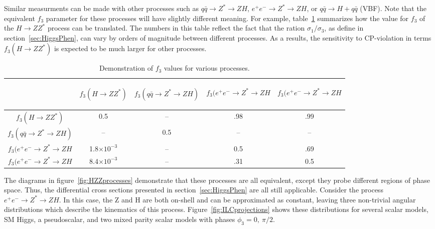 Similar measurments can be made with other processes such as
$q\bar{q}\to Z^*\to ZH$, $e^+e^-\to Z^*\to ZH$, or
$q\bar{q}\to H+q\bar{q}$ (VBF).  Note that the equivalent 
$f_3$ parameter for these processes will have slightly different 
meaning.  For example, table~\ref{table:fa3Conversion} summarizes
how the value for $f_3$ of the $H\to ZZ^*$ process can be 
translated.  The numbers in this table reflect the fact that 
the ration $\sigma_1/\sigma_3$, as define in 
section~\ref{sec:HiggsPhen}, can vary by orders of magnitude
between different processes.  As a results, the
sensitivity to CP-violation in terms $f_3(H\to ZZ^*)$ is
expected to be much larger for other processes.  

\begin{table}
\begin{center}
\begin{tabular}{c|cccc}

 &\begin{rotate}{60}$f_3(H\to ZZ^*)$ \end{rotate} 
 &\begin{rotate}{60}$f_3(q\bar{q}\to Z^*\to ZH)$ \end{rotate}
 &\begin{rotate}{60}$f_3(e^+e^-\to Z^*\to ZH$ \end{rotate}
 &\begin{rotate}{60}$f_3(e^+e^-\to Z^*\to ZH$ \end{rotate} \\ \hline

$f_3(H\to ZZ^*)$             & 0.5 & -- & .98 & .99 \\
$f_3(q\bar{q}\to Z^*\to ZH)$ & -- & 0.5 & -- & -- \\
$f_3(e^+e^-\to Z^*\to ZH$    & 1.8$\times10^{-3}$ & -- & 0.5 & .69 \\
$f_3(e^+e^-\to Z^*\to ZH$    & 8.4$\times10^{-3}$ & -- & .31 & 0.5 \\
\hline
\hline

\end{tabular}
\end{center}
\label{table:fa3Conversion}
\caption{Demonstration of $f_3$ values for various processes.}
\end{table}

The diagrams in figure~\ref{fig:HZZprocesses} demonstrate that 
these 
processes are all equivalent, except they probe different 
regions of phase space.  Thus, the differential cross sections
presented in section~\ref{sec:HiggsPhen} are all still applicable. 
Consider the process $e^+e^-\to Z^*\to ZH$.  In this case, the
Z and H are both on-shell and can be approximated as constant, 
leaving three non-trivial angular distributions which describe 
the kinematics of this process. Figure~\ref{fig:ILCprojections}
shows
these distributions for several scalar models, SM Higgs, a 
pseudoscalar, and two mixed parity scalar models with 
phases $\phi_3=0,~\pi/2$.  

